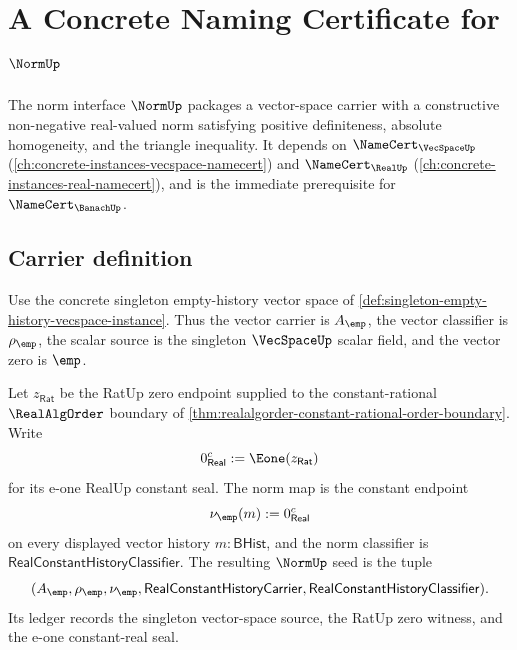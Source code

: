 \chapter{A Concrete Naming Certificate for $\NormUp$}
\label{ch:concrete-instances-norm-namecert}

The norm interface $\NormUp$ packages a vector-space carrier with a constructive non-negative real-valued norm satisfying positive definiteness, absolute homogeneity, and the triangle inequality. It depends on $\NameCert_{\VecSpaceUp}$ (\autoref{ch:concrete-instances-vecspace-namecert}) and $\NameCert_{\RealUp}$ (\autoref{ch:concrete-instances-real-namecert}), and is the immediate prerequisite for $\NameCert_{\BanachUp}$.

\section{Carrier definition}
\label{sec:norm-carrier}

\begin{definition}
\label{def:singleton-empty-history-norm-instance}
Use the concrete singleton empty-history vector space of
\autoref{def:singleton-empty-history-vecspace-instance}. Thus the vector
carrier is $A_{\emp}$, the vector classifier is $\rho_{\emp}$, the scalar
source is the singleton $\VecSpaceUp$ scalar field, and the vector zero is
$\emp$.

Let $z_{\mathsf{Rat}}$ be the RatUp zero endpoint supplied to the constant-rational
$\RealAlgOrder$ boundary of
\autoref{thm:realalgorder-constant-rational-order-boundary}. Write
$$
0_{\mathsf{Real}}^{c}:=\Eone(z_{\mathsf{Rat}})
$$
for its e-one RealUp constant seal. The norm map is the constant endpoint
$$
\nu_{\emp}(m):=0_{\mathsf{Real}}^{c}
$$
on every displayed vector history $m:\mathsf{BHist}$, and the norm classifier
is $\mathsf{RealConstantHistoryClassifier}$. The resulting $\NormUp$ seed is
the tuple
$$
(A_{\emp},\rho_{\emp},\nu_{\emp},
\mathsf{RealConstantHistoryCarrier},
\mathsf{RealConstantHistoryClassifier}).
$$
Its ledger records the singleton vector-space source, the RatUp zero witness,
and the e-one constant-real seal.
\end{definition}

